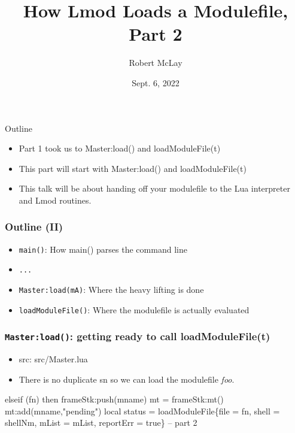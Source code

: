 \documentclass{beamer}
\begin{document}
\title[Lmod]{How Lmod Loads a Modulefile, Part 2}
\author{Robert McLay} 
\date{Sept. 6, 2022}

\frame{\titlepage} 


\begin{frame}{Outline}
  \begin{itemize}
    \item Part 1 took us to Master:load() and loadModuleFile(t)
    \item This part will start with Master:load() and loadModuleFile(t)
    \item This talk will be about handing off your modulefile to the
      Lua interpreter and Lmod routines.
  \end{itemize}
\end{frame}

\begin{frame}[fragile]
    \frametitle{Outline (II)}
  \begin{itemize}
    \item \texttt{main()}: How main() parses the command line
    \item \texttt{...}
    \item \texttt{Master:load(mA)}: Where the heavy lifting is done
    \item \texttt{loadModuleFile()}: Where the modulefile is actually evaluated
  \end{itemize}
\end{frame}

\begin{frame}[fragile]
    \frametitle{\texttt{Master:load()}: getting ready to call loadModuleFile(t)}
  \begin{itemize}
    \item src: src/Master.lua
    \item There is no duplicate sn so we can load the modulefile {\color{blue}\emph{foo}}.
  \end{itemize}
 {\tiny
    \begin{semiverbatim}
elseif (fn) then
   frameStk:push(mname)
   mt = frameStk:mt()
   mt:add(mname,"pending")
   local status = loadModuleFile\{file = fn, shell = shellNm,
                   mList = mList, reportErr = true\}
   -- part 2

    \end{semiverbatim}
}
\end{frame}
\end{document}
